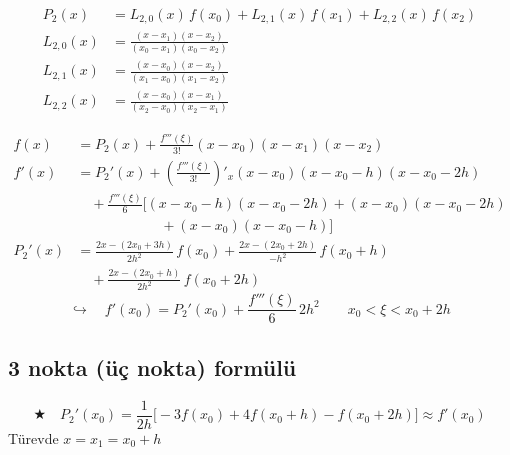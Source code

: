 \documentclass[11pt,a4paper]{article}
\begin{document}
\noindent
\begin{minipage}[c]{0.6\linewidth}
\begin{align*}
  P_2(x) &= L_{2,0}(x)\,f(x_0) + L_{2,1}(x)\,f(x_1) + L_{2,2}(x)\,f(x_2)\\
  L_{2,0}(x) &= \frac{(x-x_1)(x-x_2)}{(x_0-x_1)(x_0-x_2)}\\
  L_{2,1}(x) &= \frac{(x-x_0)(x-x_2)}{(x_1-x_0)(x_1-x_2)}\\
  L_{2,2}(x) &= \frac{(x-x_0)(x-x_1)}{(x_2-x_0)(x_2-x_1)}
\end{align*}
\end{minipage}\hfill
\begin{minipage}[c]{0.36\linewidth}
\centering
{}
\end{minipage}

\begin{align*}
  f(x) &= P_2(x) + \frac{f'''(\xi)}{3!}(x-x_0)(x-x_1)(x-x_2)\\
  f'(x) &= P_2'(x) + \left(\frac{f'''(\xi)}{3!}\right)'_x (x-x_0)(x-x_0-h)(x-x_0-2h)\\
  &\quad + \frac{f'''(\xi)}{6}\Big[(x-x_0-h)(x-x_0-2h) + (x-x_0)(x-x_0-2h)\\
  &\qquad\qquad\qquad + (x-x_0)(x-x_0-h)\Big]\\
  P_2'(x) &= \frac{2x - (2x_0+3h)}{2h^2}\,f(x_0) + \frac{2x - (2x_0+2h)}{-h^2}\,f(x_0+h)\\
  &\quad + \frac{2x - (2x_0+h)}{2h^2}\,f(x_0+2h)
\end{align*}
\[
  \hookrightarrow\quad f'(x_0) = P_2'(x_0) + \frac{f'''(\xi)}{6}\,2h^2 \qquad x_0 < \xi < x_0 + 2h
\]

\subsection{3 nokta (üç nokta) formülü}
\[
  \bigstar\quad P_2'(x_0) = \frac{1}{2h}\Big[-3f(x_0) + 4f(x_0+h) - f(x_0+2h)\Big] \approx f'(x_0)
\]
Türevde $x = x_1 = x_0 + h$
\end{document}

